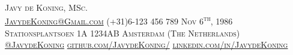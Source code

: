 \documentclass[a4paper, oneside, final]{article}
\begin{document}
\begin{center}


\fontsize{28}{28}\selectfont\scshape
Javy de Koning, MSc.\\

\fontsize{10}{10}\selectfont\scshape
{\faEnvelopeS} \url{JavydeKoning@Gmail.com}
{\faPhoneSquare} (+31)6-123 456 789 
{\faCalendarS} Nov 6\textsuperscript{th}, 1986\\

{\faMapMarker} Stationsplantsoen 1A 
{\large\textperiodcentered} 1234AB 
{\large\textperiodcentered} Amsterdam (The Netherlands) \\

{\faTwitter} \href{https://twitter.com/javydekoning}{@JavydeKoning} 
{\faGitHubSquare} \url{github.com/JavydeKoning/} 
{\faLinkedIn} \url{linkedin.com/in/JavydeKoning}

\end{center}
\end{document}
